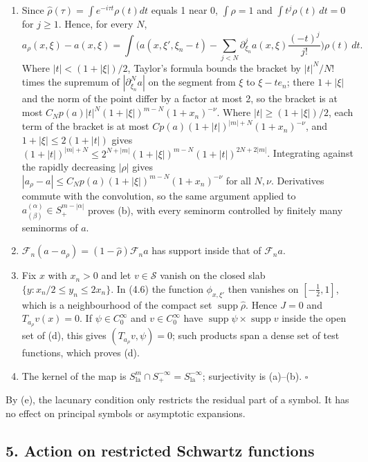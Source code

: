\documentclass[
  11pt,
]{article}
\begin{document}
\begin{enumerate}
\def\labelenumi{(\alph{enumi})}
\setcounter{enumi}{1}
\item
  Since \(\widehat\rho(\tau)=\int e^{-i\tau t}\rho(t)dt\) equals 1 near
  0, \(\int\rho=1\) and \(\int t^j\rho(t)\,dt=0\) for \(j\geq1\). Hence,
  for every \(N\), \[
a_\rho(x,\xi)-a(x,\xi)=\int\Big(a(x,\xi',\xi_n-t)-\sum_{j<N}\partial_{\xi_n}^ja(x,\xi)\frac{(-t)^j}{j!}\Big)\rho(t)\,dt .
\tag{4.8}
\] Where \(|t|<(1+|\xi|)/2\), Taylor's formula bounds the bracket by
  \(|t|^N/N!\) times the supremum of \(|\partial^N_{\xi_n}a|\) on the
  segment from \(\xi\) to \(\xi-te_n\); there \(1+|\xi|\) and the norm
  of the point differ by a factor at most 2, so the bracket is at most
  \(C_Np(a)|t|^N(1+|\xi|)^{m-N}(1+x_n)^{-\nu}\). Where
  \(|t|\geq(1+|\xi|)/2\), each term of the bracket is at most
  \(Cp(a)(1+|t|)^{|m|+N}(1+x_n)^{-\nu}\), and \(1+|\xi|\leq2(1+|t|)\)
  gives
  \((1+|t|)^{|m|+N}\leq2^{N+|m|}(1+|\xi|)^{m-N}(1+|t|)^{2N+2|m|}\).
  Integrating against the rapidly decreasing \(|\rho|\) gives
  \(|a_\rho-a|\leq C_Np(a)(1+|\xi|)^{m-N}(1+x_n)^{-\nu}\) for all
  \(N,\nu\). Derivatives commute with the convolution, so the same
  argument applied to \(a^{(\alpha)}_{(\beta)}\in S^{m-|\alpha|}_+\)
  proves (b), with every seminorm controlled by finitely many seminorms
  of \(a\).
\item
  \(\mathcal F_n(a-a_\rho)=(1-\widehat\rho)\mathcal F_na\) has support
  inside that of \(\mathcal F_na\).
\item
  Fix \(x\) with \(x_n>0\) and let \(v\in\mathcal S\) vanish on the
  closed slab \(\{y:x_n/2\leq y_n\leq2x_n\}\). In (4.6) the function
  \(\phi_{x,\xi'}\) then vanishes on \([-\tfrac12,1]\), which is a
  neighbourhood of the compact set \(\operatorname{supp}\widehat\rho\).
  Hence \(J=0\) and \(T_{a_\rho}v(x)=0\). If \(\psi\in C_0^\infty\) and
  \(v\in C_0^\infty\) have
  \(\operatorname{supp}\psi\times\operatorname{supp}v\) inside the open
  set of (d), this gives \((T_{a_\rho}v,\psi)=0\); such products span a
  dense set of test functions, which proves (d).
\item
  The kernel of the map is
  \(S^m_{\mathrm{la}}\cap S^{-\infty}_+=S^{-\infty}_{\mathrm{la}}\);
  surjectivity is (a)--(b). \(\square\)
\end{enumerate}

By (e), the lacunary condition only restricts the residual part of a
symbol. It has no effect on principal symbols or asymptotic expansions.

\subsection{5. Action on restricted Schwartz
functions}\label{action-on-restricted-schwartz-functions}
\end{document}
